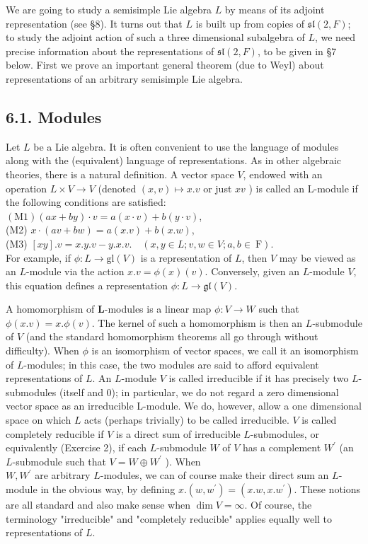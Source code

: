\documentclass[10pt]{article}
\begin{document}
We are going to study a semisimple Lie algebra $L$ by means of its adjoint representation (see §8). It turns out that $L$ is built up from copies of $\mathfrak{s l}(2, F)$; to study the adjoint action of such a three dimensional subalgebra of $L$, we need precise information about the representations of $\mathfrak{s l}(2, F)$, to be given in §7 below. First we prove an important general theorem (due to Weyl) about representations of an arbitrary semisimple Lie algebra.

\subsection*{6.1. Modules}
Let $L$ be a Lie algebra. It is often convenient to use the language of modules along with the (equivalent) language of representations. As in other algebraic theories, there is a natural definition. A vector space $V$, endowed with an operation $L \times V \rightarrow V$ (denoted $(x, v) \mapsto x . v$ or just $x v$ ) is called an L-module if the following conditions are satisfied:\\
$(\mathrm{M} 1)(a x+b y) \cdot v=a(x \cdot v)+b(y \cdot v)$,\\
(M2) $x \cdot(a v+b w)=a(x . v)+b(x . w)$,\\
(M3) $[x y] . v=x . y . v-y . x . v . \quad(x, y \in L ; v, w \in V ; a, b \in \mathrm{~F})$.\\
For example, if $\phi: L \rightarrow \mathrm{gl}(V)$ is a representation of $L$, then $V$ may be viewed as an $L$-module via the action $x . v=\phi(x)(v)$. Conversely, given an $L$-module $V$, this equation defines a representation $\phi: L \rightarrow \mathfrak{g l}(V)$.

A homomorphism of $\mathbf{L}$-modules is a linear map $\phi: V \rightarrow W$ such that $\phi(x . v)=x . \phi(v)$. The kernel of such a homomorphism is then an $L$-submodule of $V$ (and the standard homomorphism theorems all go through without difficulty). When $\phi$ is an isomorphism of vector spaces, we call it an isomorphism of $L$-modules; in this case, the two modules are said to afford equivalent representations of $L$. An $L$-module $V$ is called irreducible if it has precisely two $L$-submodules (itself and 0); in particular, we do not regard a zero dimensional vector space as an irreducible L-module. We do, however, allow a one dimensional space on which $L$ acts (perhaps trivially) to be called irreducible. $V$ is called completely reducible if $V$ is a direct sum of irreducible $L$-submodules, or equivalently (Exercise 2), if each $L$-submodule $W$ of $V$ has a complement $W^{\prime}$ (an $L$-submodule such that $V=W \oplus W^{\prime}$ ). When\\
$W, W^{\prime}$ are arbitrary $L$-modules, we can of course make their direct sum an $L$-module in the obvious way, by defining $x .\left(w, w^{\prime}\right)=\left(x . w, x . w^{\prime}\right)$. These notions are all standard and also make sense when $\operatorname{dim} V=\infty$. Of course, the terminology "irreducible" and "completely reducible" applies equally well to representations of $L$.
\end{document}
